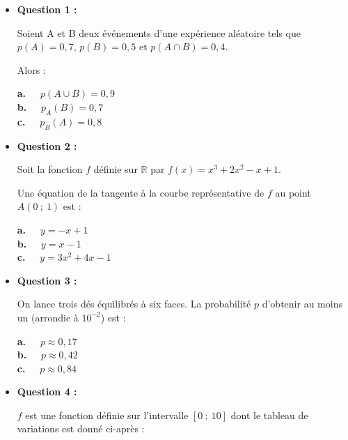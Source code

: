 \begin{itemize}
     \item \textbf{Question 1 :}
     \par
     Soient A et B deux événements d'une expérience aléatoire tels que $p(A)=0,7$, $p(B)=0,5$ et $p(A \cap B)=0,4$.
     \par
     Alors :
     \par
     \textbf{a.~~} $p(A \cup B)=0,9$ \\
     \textbf{b.~~} $p_A(B)=0,7$ \\
     \textbf{c.~~} $p_B(A)=0,8$ \\
     \par
     \item \textbf{Question 2 :}
     \par
     Soit la fonction $f$ définie sur $\mathbb{R}$ par $f(x)=x^3+2x^2-x+1$.
     \par
     Une équation de la tangente à la courbe représentative de $f$ au point $A(0~;~1)$ est :
     \par
     \textbf{a.~~} $y=-x+1$ \\
     \textbf{b.~~} $y=x-1$ \\
     \textbf{c.~~} $y=3x^2+4x-1$ \\
     \par
     \item \textbf{Question 3 :}
     \par
     On lance trois dés équilibrés à six faces. La probabilité $p$ d'obtenir au moins un  \fg{} (arrondie à $10^{-2}$) est :
     \par
     \textbf{a.~~} $p \approx 0,17$ \\
     \textbf{b.~~} $p \approx 0,42$  \\
     \textbf{c.~~} $p \approx 0,84$ \\
     \par
     \item \textbf{Question 4 :}
     \par
     $f$ est une fonction définie sur l'intervalle $[0~;~10]$ dont le tableau de variations est donné ci-après :
     \begin{center}
          \begin{extern}%
\end{extern}
\end{center}
\end{itemize}
